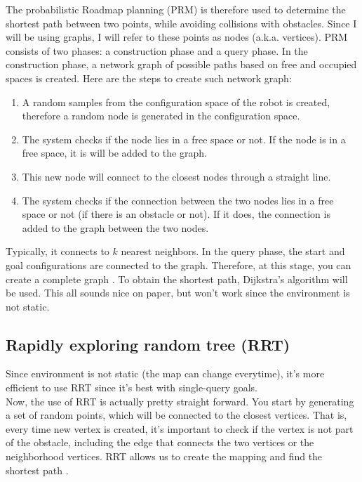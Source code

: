\documentclass{article}
\begin{document}
The probabilistic Roadmap planning (PRM) is therefore used to determine the shortest path between two points, while avoiding collisions with obstacles. Since I will be using graphs, I will refer to these points as nodes (a.k.a. vertices). PRM consists of two phases: a construction phase and a query phase. In the construction phase, a network graph of possible paths based on free and occupied spaces is created. Here are the steps to create such network graph: 
\begin{enumerate}
    \item A random samples from the configuration space of the robot is created, therefore a random node is generated in the configuration space.
    \item The system checks if the node lies in a free space or not. If the node is in a free space, it is will be added to the graph. 
    \item This new node will connect to the closest nodes through a straight line. 
    \item The system checks if the connection between the two nodes lies in a free space or not (if there is an obstacle or not). If it does, the connection is added to the graph between the two nodes.
\end{enumerate}

Typically, it connects to $k$ nearest neighbors. In the query phase, the start and goal configurations are connected to the graph. Therefore, at this stage, you can create a complete graph \cite{Khokhar_PRM_2021}. To obtain the shortest path, Dijkstra's algorithm will be used. This all sounds nice on paper, but won't work since the environment is not static. \\


\subsection{Rapidly exploring random tree (RRT)}

Since environment is not static (the map can change everytime), it's more efficient to use RRT since it's best with single-query goals. \\

Now, the use of RRT is actually pretty straight forward. You start by generating a set of random points, which will be connected to the closest vertices. That is, every time new vertex is created, it's important to check if the vertex is not part of the obstacle, including the edge that connects the two vertices or the neighborhood vertices. RRT allows us to create the mapping and find the shortest path \cite{Chinenov_RRT_2019}. \\
\end{document}
